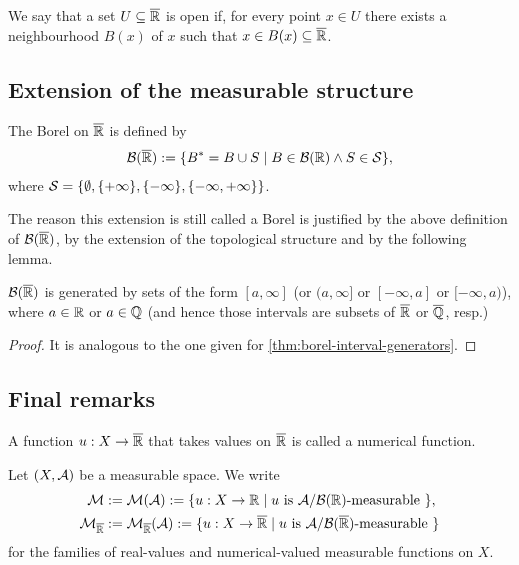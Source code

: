 \begin{dfn}
	We say that a set $U \subseteq {\overline{\mathbb{R}}}$ is open if, for every point $x \in U$ there exists a neighbourhood $B(x)$ of $x$ such that $x \in B(x) \subseteq {\overline{\mathbb{R}}}$.
\end{dfn}

\subsection{Extension of the measurable structure}

\begin{dfn}
	The Borel \siga on ${\overline{\mathbb{R}}}$ is defined by
	\begin{align*}
		\mathcal{B}({\overline{\mathbb{R}}}) := \{ B^\ast = B \cup S \mid B \in \mathcal{B}(\mathbb{R}) \land S \in \mathcal{S}\},
	\end{align*}
	where $\mathcal{S} = \left\{\emptyset, \{+\infty\}, \{-\infty\}, \{-\infty, +\infty\}\right\}$.
\end{dfn}

The reason this extension is still called a Borel \siga is justified by the above definition of $\mathcal{B}({\overline{\mathbb{R}}})$, by the extension of the topological structure and by the following lemma.

\begin{lem}
	$\mathcal{B}({\overline{\mathbb{R}}})$ is generated by sets of the form $[a, \infty]$ (or $(a, \infty]$ or $[-\infty, a]$ or $[-\infty, a)$), where $a \in \mathbb{R}$ or $a \in \mathbb{Q}$ (and hence those intervals are subsets of ${\overline{\mathbb{R}}}$ or $\overline{\mathbb{Q}}$, resp.)
\end{lem}

\begin{proof}
	It is analogous to the one given for \autoref{thm:borel-interval-generators}.
\end{proof}

\subsection{Final remarks}

\begin{dfn}
	A function $u : X \to {\overline{\mathbb{R}}}$ that takes values on ${\overline{\mathbb{R}}}$ is called a numerical function.
\end{dfn}

\begin{dfn}
	Let $(X, \mathcal{A})$ be a measurable space. We write
	\begin{align*}
		\mathcal{M} &:= \mathcal{M}(\mathcal{A}) := \{u : X \to \mathbb{R} \mid u \text{ is } \mathcal{A}/\mathcal{B}(\mathbb{R})\text{-measurable }\},\\
		\mathcal{M}_{{\overline{\mathbb{R}}}} &:= \mathcal{M}_{{\overline{\mathbb{R}}}}(\mathcal{A}) := \{u : X \to {\overline{\mathbb{R}}} \mid u \text{ is } \mathcal{A}/\mathcal{B}({\overline{\mathbb{R}}})\text{-measurable }\}
	\end{align*}
	for the families of real-values and numerical-valued measurable functions on $X$.
\end{dfn}

